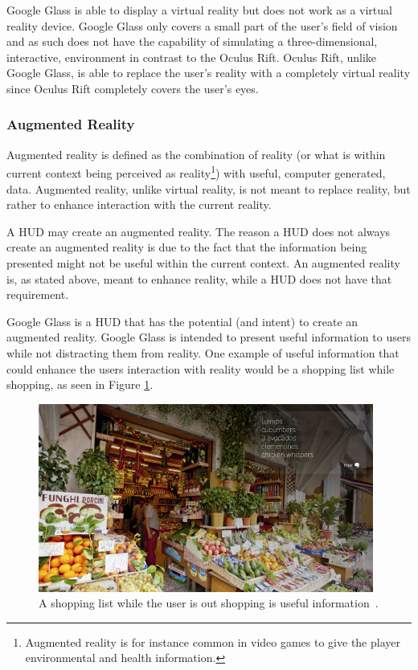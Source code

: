 Google Glass is able to display a virtual reality but does not work as a virtual reality device. Google Glass only covers a small part of the user's field of vision and as such does not have the capability of simulating a three-dimensional, interactive, environment in contrast to the Oculus Rift. Oculus Rift, unlike Google Glass, is able to replace the user's reality with a completely virtual reality since Oculus Rift completely covers the user's eyes.

\subsubsection{Augmented Reality}
\label{subsubsec:ar}
Augmented reality\cite{augmentedRealityDef} is defined as the combination of reality (or what is within current context being perceived as reality\footnote{Augmented reality is for instance common in video games to give the player environmental and health information.}) with useful, computer generated, data. Augmented reality, unlike virtual reality, is not meant to replace reality, but rather to enhance interaction with the current reality.

A HUD may create an augmented reality. The reason a HUD does not always create an augmented reality is due to the fact that the information being presented might not be useful within the current context. An augmented reality is, as stated above, meant to enhance reality, while a HUD does not have that requirement.

Google Glass is a HUD that has the potential (and intent) to create an augmented reality. Google Glass is intended to present useful information to users while not distracting them from reality. One example of useful information that could enhance the users interaction with reality would be a shopping list while shopping, as seen in Figure \ref{GlassShopping}.

	\begin{figure}[ht!]
		\centering
		\includegraphics[width=110mm]{images/GoogleGlassKeepRevelant}
		\caption{A shopping list while the user is out shopping is useful information~\cite{glassDesignPrinciples}.}
		\label{GlassShopping}
	\end{figure}
	
